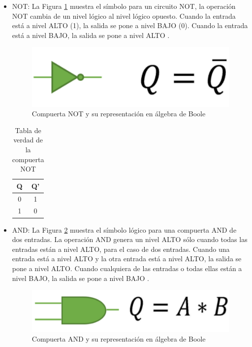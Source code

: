 \documentclass[journal]{IEEEtran}
\begin{document}
	\begin{itemize}
		\item NOT: La Figura \ref{fig:NOT} muestra el símbolo para un circuito NOT, la operación NOT cambia de un nivel lógico al nivel lógico opuesto. Cuando la entrada está a nivel ALTO (1), la salida se pone a nivel BAJO (0). Cuando la entrada está a nivel BAJO, la salida se pone a nivel ALTO \cite{Floyd2006}.
		
		\begin{figure}
			\centering
			\includegraphics[scale = 0.5]{img/NOT.png}
			\caption{Compuerta NOT y su representación en álgebra de Boole \cite{Tocci2007}}
			\label{fig:NOT}
		\end{figure}
		
		\begin{table}[!htb]
			\centering
			\begin{tabular}{|c|c|}
				\hline
				Q & Q' \\
				\hline
				\hline
				0 & 1 \\
				\hline
				1 & 0 \\
				\hline
			\end{tabular}
			\caption{Tabla de verdad de la compuerta NOT}
			\label{tab:NOT}
		\end{table}
		
		\item AND: La Figura \ref{fig:AND} muestra el símbolo lógico para una compuerta AND de dos entradas. La operación AND genera un nivel ALTO sólo cuando todas las entradas están a nivel ALTO, para el caso de dos entradas. Cuando una entrada está a nivel ALTO y la otra entrada está a nivel ALTO, la salida se pone a nivel ALTO. Cuando cualquiera de las entradas o todas ellas están a nivel BAJO, la salida se pone a nivel BAJO \cite{Floyd2006}.
		
		\begin{figure}[!htb]
			\centering
			\includegraphics[scale = 0.3]{img/AND.png}
			\caption{Compuerta AND y su representación en álgebra de Boole \cite{Tocci2007}}
			\label{fig:AND}
		\end{figure}
		

\end{itemize}
\end{document}
